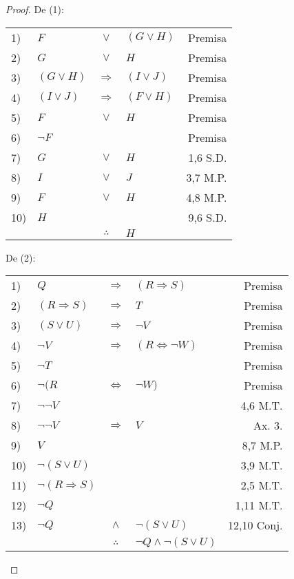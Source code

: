 \documentclass[12pt]{report}
\theoremstyle{largebreak}
\begin{document}
    \begin{proof}
        De (1):
        \begin{center}
            \begin{tabular}{l l c l r}
                1) & $F$ & $\lor$ & $(G\lor H)$ & Premisa \\
                2) & $G$ & $\lor$ & $H$ & Premisa \\
                3) & $(G\lor H)$ & $\Rightarrow$ & $(I\lor J)$ & Premisa \\
                4) & $(I\lor J)$ & $\Rightarrow$ & $(F\lor H)$ & Premisa \\
                5) & $F$ & $\lor$ & $H$ & Premisa \\
                6) & $\neg F$ &  &  & Premisa \\
                7) & $G$ & $\lor$ & $H$ & 1,6 S.D. \\
                8) & $I$ & $\lor$ & $J$ & 3,7 M.P. \\
                9) & $F$ & $\lor$ & $H$ & 4,8 M.P. \\
                10) & $H$ &  &  & 9,6 S.D. \\
                \hline
                & & $\therefore$ & $H$  & \\
            \end{tabular}
        \end{center}

        De (2):
        \begin{center}
            \begin{tabular}{l l c l r}
                1) & $Q$ & $\Rightarrow$ & $(R\Rightarrow S)$ & Premisa \\
                2) & $(R\Rightarrow S)$ & $\Rightarrow$ & $T$ & Premisa \\
                3) & $(S\lor U)$ & $\Rightarrow$ & $\neg V$ & Premisa \\
                4) & $\neg V$ & $\Rightarrow$ & $(R\iff \neg W)$ & Premisa \\
                5) & $\neg T$ &  &  & Premisa \\
                6) & $\neg(R$ & $\iff$ & $\neg W)$ & Premisa \\
                7) & $\neg\neg V$ &  &  & 4,6 M.T. \\
                8) & $\neg\neg V$ & $\Rightarrow$  & $V$ & Ax. 3. \\
                9) & $V$ &  &  & 8,7 M.P. \\
                10) & $\neg(S\lor U)$ &  &  & 3,9 M.T. \\
                11) & $\neg(R\Rightarrow S)$ &  &  & 2,5 M.T. \\
                12) & $\neg Q$ &  &  & 1,11 M.T. \\
                13) & $\neg Q$ & $\land$ & $\neg(S\lor U)$ & 12,10 Conj.\\
                \hline
                & & $\therefore$ & $\neg Q\land\neg(S\lor U)$  & \\
            \end{tabular}
        \end{center}


\end{proof}
\end{document}
